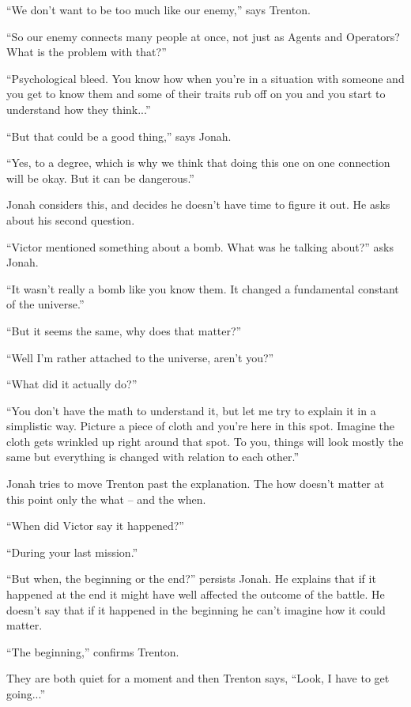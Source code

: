 ``We don't want to be too much like our enemy,'' says Trenton.

``So our enemy connects many people at once, not just as Agents and Operators?  What is the problem with that?''

``Psychological bleed.  You know how when you're in a situation with someone and you get to know them and some of their traits rub off on you and you start to understand how they think...''

``But that could be a good thing,'' says Jonah.

``Yes, to a degree, which is why we think that doing this one on one connection will be okay.  But it can be dangerous.''

Jonah considers this, and decides he doesn't have time to figure it out.  He asks about his second question.

``Victor mentioned something about a bomb.  What was he talking about?'' asks Jonah.

``It wasn't really a bomb like you know them.  It changed a fundamental constant of the universe.''

``But it seems the same, why does that matter?''

``Well I'm rather attached to the universe, aren't you?''

``What did it actually do?''

``You don't have the math to understand it, but let me try to explain it in a simplistic way.  Picture a piece of cloth and you're here in this spot.  Imagine the cloth gets wrinkled up right around that spot.  To you, things will look mostly the same but everything is changed with relation to each other.''

Jonah tries to move Trenton past the explanation.  The how doesn't matter at this point only the what -- and the when.

``When did Victor say it happened?''

``During your last mission.''

``But when, the beginning or the end?'' persists Jonah.  He explains that if it happened at the end it might have well affected the outcome of the battle.  He doesn't say that if it happened in the beginning he can't imagine how it could matter.

``The beginning,'' confirms Trenton.

They are both quiet for a moment and then Trenton says, ``Look, I have to get going...''

